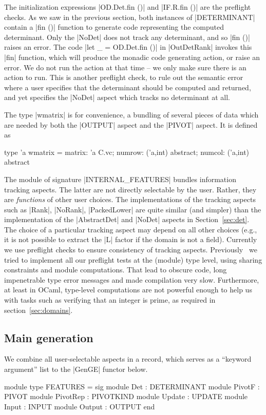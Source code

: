 \documentclass{elsart}
\begin{document}
The initialization expressions |OD.Det.fin ()| and |IF.R.fin ()| are
the preflight checks. As we saw in the previous section, 
both instances of |DETERMINANT| contain a |fin ()| function to generate
code representing the computed determinant. Only the |NoDet| does not
track any determinant, and so |fin ()| raises an error. The code 
|let _ = OD.Det.fin ()| in |OutDetRank| invokes this |fin| function, which will
produce the monadic code generating action, or raise an error. We do
not run the action at that time -- we only make sure there is an
action to run. This is another preflight check, to rule out the
semantic error where a user specifies that the determinant should be computed
and returned, and yet specifies the |NoDet| aspect which tracks no
determinant at all.

The type |wmatrix| is for convenience, a bundling of several pieces
of data which are needed by both the |OUTPUT| aspect and the |PIVOT| 
aspect.  It is defined as
\begin{code}
type 'a wmatrix = {matrix: 'a C.vc; numrow: ('a,int) abstract; 
                   numcol: ('a,int) abstract}
\end{code}

The module of signature |INTERNAL_FEATURES| bundles information
tracking aspects. The latter are not directly selectable by the
user. Rather, they are \emph{functions} of other user choices. The
implementations of the tracking aspects such as |Rank|, |NoRank|,
|PackedLower| are quite similar (and simpler) than the implementation
of the |AbstractDet| and |NoDet| aspects in Section~\ref{sec:det}. The
choice of a particular tracking aspect may depend on all other choices
(e.g., it is not possible to extract the |L| factor if the domain is
not a field). Currently we use preflight checks to ensure consistency
of tracking aspects. Previously~\cite{CaretteKiselyov05} we tried to
implement all our preflight tests at the (module) type level, using
sharing constraints and module computations. That lead to obscure
code, long impenetrable type error messages and made compilation very
slow.  Furthermore, at least in OCaml, type-level computations are not
powerful enough to help us with tasks such as verifying that an integer
is prime, as required in section~\ref{sec:domains}.

\subsection{Main generation}
We combine all user-selectable aspects in a record, which serves as a ``keyword
argument'' list to the |GenGE| functor below.
\begin{code}
module type FEATURES = sig
  module Det       : DETERMINANT
  module PivotF    : PIVOT
  module PivotRep  : PIVOTKIND
  module Update    : UPDATE
  module Input     : INPUT
  module Output    : OUTPUT
end
\end{code}
\end{document}
